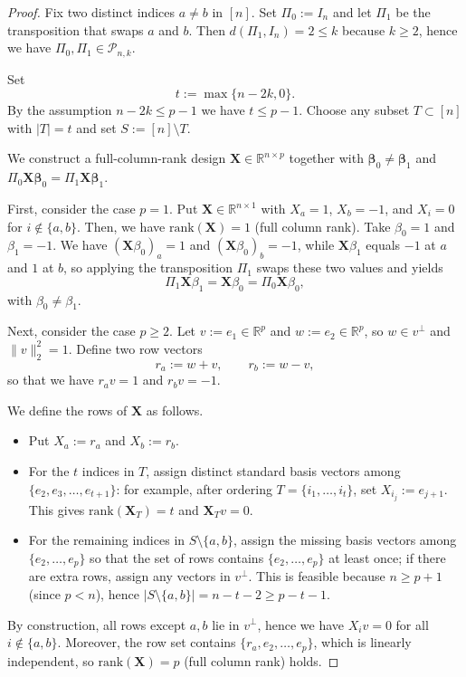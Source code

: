 \documentclass[11pt, reqno]{amsart}
\newcommand{\R}{\mathbb{R}}
\renewcommand{\le}{\leqslant}
\renewcommand{\ge}{\geqslant}
\newcommand{\mP}{\mathcal{P}}
\newcommand{\1}{\mbox{1}\hspace{-0.25em}\mbox{l}}
\newcommand{\rank}{\mathrm{rank}}
\theoremstyle{definition}\newtheorem{problem}{Problem}[section]
\theoremstyle{definition}\newtheorem{definition}[problem]{Definition}
\theoremstyle{remark}\newtheorem{assumption}{Assumption}
\theoremstyle{remark}\newtheorem{remark}[problem]{Remark}
\theoremstyle{definition}\newtheorem{example}[problem]{Example}
\theoremstyle{plain}\newtheorem{theorem}[problem]{Theorem}
\theoremstyle{plain}\newtheorem{question}[problem]{Question}
\theoremstyle{plain}\newtheorem{lemma}[problem]{Lemma}
\theoremstyle{plain}\newtheorem{proposition}[problem]{Proposition}
\theoremstyle{plain}\newtheorem{corollary}[problem]{Corollary}
\theoremstyle{plain}\newtheorem{conjecture}[problem]{Conjecture}
\begin{document}
\begin{proof}
Fix two distinct indices $a\neq b$ in $[n]$. Set $\Pi_0:=I_n$ and let $\Pi_1$ be the transposition that swaps $a$ and $b$.
Then $d(\Pi_1,I_n)=2\le k$ because $k\ge2$, hence we have $\Pi_0,\Pi_1\in\mP_{n,k}$.

Set
\[
t:=\max\{n-2k,0\}.
\]
By the assumption $n-2k\le p-1$ we have $t\le p-1$. Choose any subset $T\subset[n]$ with $|T|=t$ and set $S:=[n]\setminus T$.

We construct a full-column-rank design $\bm X\in\R^{n\times p}$ together with $\bm\beta_0\ne\bm\beta_1$
and $\Pi_0\bm X\bm\beta_0=\Pi_1\bm X\bm\beta_1$.

First, consider the case $p=1$. Put $\bm X\in\R^{n\times1}$ with $X_a=1$, $X_b=-1$, and $X_i=0$ for $i\notin\{a,b\}$.
Then, we have $\rank(\bm X)=1$ (full column rank). Take $\beta_0=1$ and $\beta_1=-1$.
We have $(\bm X\beta_0)_a=1$ and $(\bm X\beta_0)_b=-1$, while $\bm X\beta_1$ equals $-1$ at $a$ and $1$ at $b$,
so applying the transposition $\Pi_1$ swaps these two values and yields
\[
\Pi_1\bm X\beta_1=\bm X\beta_0=\Pi_0\bm X\beta_0,
\]
with $\beta_0\ne\beta_1$.

Next, consider the case $p\ge2$.
Let $v:=e_1\in\R^p$ and $w:=e_2\in\R^p$, so $w\in v^\perp$ and $\|v\|_2^2=1$. Define two row vectors
\[
r_a:=w+v,\qquad r_b:=w-v,
\]
so that we have $r_a v=1$ and $r_b v=-1$.

We define the rows of $\bm X$ as follows.
\begin{itemize}
\item Put $X_a:=r_a$ and $X_b:=r_b$.
\item For the $t$ indices in $T$, assign distinct standard basis vectors among $\{e_2,e_3,\dots,e_{t+1}\}$:
for example, after ordering $T=\{i_1,\dots,i_t\}$, set $X_{i_j}:=e_{j+1}$.
This gives $\rank(\bm X_T)=t$ and $\bm X_T v=0$.
\item For the remaining indices in $S\setminus\{a,b\}$, assign the missing basis vectors among $\{e_2,\dots,e_p\}$
so that the set of rows contains $\{e_2,\dots,e_p\}$ at least once; if there are extra rows, assign any vectors in $v^\perp$. This is feasible because $n\ge p+1$ (since $p<n$), hence
$|S\setminus\{a,b\}| = n-t-2 \ge p-t-1$.
\end{itemize}
By construction, all rows except $a,b$ lie in $v^\perp$, hence we have $X_i v=0$ for all $i\notin\{a,b\}$.
Moreover, the row set contains $\{r_a,e_2,\dots,e_p\}$, which is linearly independent, so $\rank(\bm X)=p$
(full column rank) holds.


\end{proof}
\end{document}
